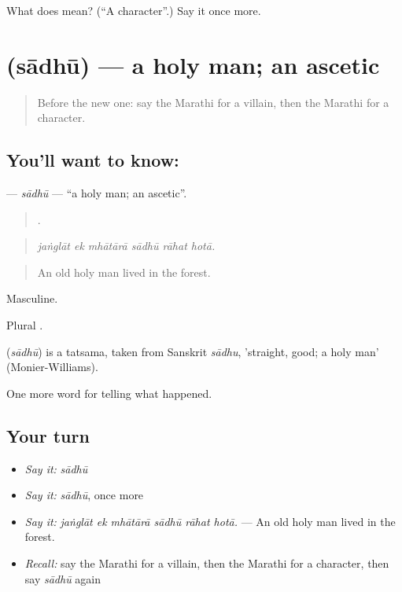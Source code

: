\begin{tcolorbox}[breakable,colback=teal!4,colframe=teal!35!black,title={Before you move on}]
What does  mean? (\textquotedblleft{}A character\textquotedblright{}.) Say it once more.
\end{tcolorbox}
\section[\texorpdfstring{\mr{साधू} (sādhū)}{साधू (sādhū)}]{ (sādhū) — a holy man; an ascetic}

\label{lesson:MR-C339-sadhu}



\begin{quote}
Before the new one: say the Marathi for a villain, then the Marathi for a character.
\end{quote}

\subsection*{You'll want to know: }
\textbf{} — \emph{sādhū} — \textquotedblleft{}a holy man; an ascetic\textquotedblright{}.

\begin{quote}
     .
\end{quote}

\begin{quote}
\emph{jaṅglāt ek mhātārā sādhū rāhat hotā.}
\end{quote}

\begin{quote}
An old holy man lived in the forest.
\end{quote}

Masculine.

Plural .

\begin{cousinweb}
\textbf{} (\emph{sādhū}) is a tatsama, taken from Sanskrit \emph{sādhu}, 'straight, good; a holy man' (Monier-Williams).
\end{cousinweb}

\begin{grammarlens}[title={What you've built}]
One more word for telling what happened.
\end{grammarlens}

\subsection*{Your turn}
\begin{itemize}
\raggedright
  \item \emph{Say it:} \emph{sādhū}
  \item \emph{Say it:} \emph{sādhū}, once more
  \item \emph{Say it:} \emph{jaṅglāt ek mhātārā sādhū rāhat hotā.} — An old holy man lived in the forest.
  \item \emph{Recall:} say the Marathi for a villain, then the Marathi for a character, then say \emph{sādhū} again
\end{itemize}

